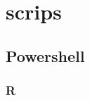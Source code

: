 \section{scrips}

\subsection{Powershell}\label{apx:code:datacollect}



\subsubsection{R}\label{apx:code:dataanal}

